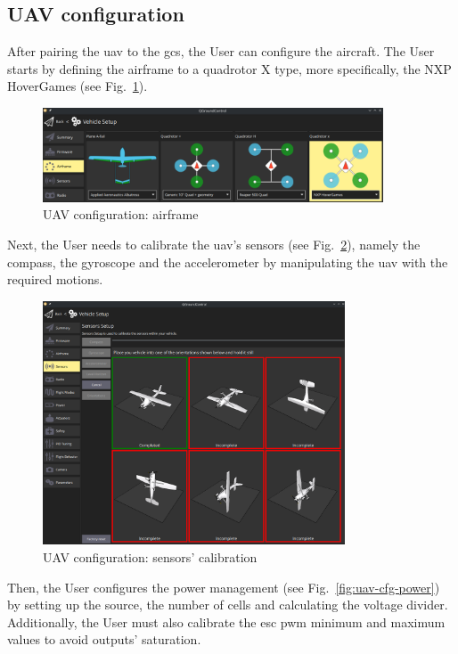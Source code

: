 \subsection{UAV configuration}
\label{sec:uav-configuration}
After pairing the \gls{uav} to the \gls{gcs}, the User can configure the
aircraft. The User starts by defining the airframe to a quadrotor X type, more
specifically, the NXP HoverGames (see Fig.~\ref{fig:uav-cfg-airframe}).

\begin{figure}[!hbt]
  \centering
  \includegraphics[width=0.9\textwidth]{./img/png/qgc-airframe} 
  \caption{UAV configuration: airframe}
  \label{fig:uav-cfg-airframe}
\end{figure}

Next, the User needs to calibrate the \gls{uav}'s sensors (see
Fig.~\ref{fig:uav-cfg-sensors}), namely the compass, the gyroscope and the
accelerometer by manipulating the \gls{uav} with the required motions.

\begin{figure}[!hbt]
  \centering
  \includegraphics[width=0.8\textwidth]{./img/png/qgc-sensors} 
  \caption{UAV configuration: sensors' calibration}
  \label{fig:uav-cfg-sensors}
\end{figure}

Then, the User configures the power management (see
Fig.~\ref{fig:uav-cfg-power}) by setting up the source, the number of cells and
calculating the voltage divider. Additionally, the User must also calibrate the
\gls{esc} \gls{pwm} minimum and maximum values to avoid outputs' saturation.

